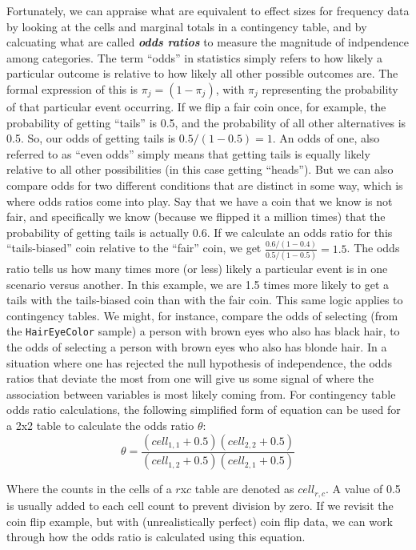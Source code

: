 \documentclass[]{book}
\begin{document}
Fortunately, we can appraise what are equivalent to effect sizes for frequency data by looking at the cells and marginal totals in a contingency table, and by calcuating what are called \textbf{\emph{odds ratios}} to measure the magnitude of indpendence among categories. The term ``odds'' in statistics simply refers to how likely a particular outcome is relative to how likely all other possible outcomes are. The formal expression of this is \(\pi_j=(1-\pi_j)\), with \(\pi_j\) representing the probability of that particular event occurring. If we flip a fair coin once, for example, the probability of getting ``tails'' is 0.5, and the probability of all other alternatives is 0.5. So, our odds of getting tails is \(0.5/(1-0.5) = 1\). An odds of one, also referred to as ``even odds'' simply means that getting tails is equally likely relative to all other possibilities (in this case getting ``heads''). But we can also compare odds for two different conditions that are distinct in some way, which is where odds ratios come into play. Say that we have a coin that we know is not fair, and specifically we know (because we flipped it a million times) that the probability of getting tails is actually 0.6. If we calculate an odds ratio for this ``tails-biased'' coin relative to the ``fair'' coin, we get
\(\frac{0.6/(1-0.4)}{0.5/(1-0.5)}=1.5\). The odds ratio tells us how many times more (or less) likely a particular event is in one scenario versus another. In this example, we are 1.5 times more likely to get a tails with the tails-biased coin than with the fair coin. This same logic applies to contingency tables. We might, for instance, compare the odds of selecting (from the \texttt{HairEyeColor} sample) a person with brown eyes who also has black hair, to the odds of selecting a person with brown eyes who also has blonde hair. In a situation where one has rejected the null hypothesis of independence, the odds ratios that deviate the most from one will give us some signal of where the association between variables is most likely coming from. For contingency table odds ratio calculations, the following simplified form of equation can be used for a 2x2 table to calculate the odds ratio \(\theta\):
\[\theta=\frac{(cell_{1,1}+0.5)(cell_{2,2}+0.5)}{(cell_{1,2}+0.5)(cell_{2,1}+0.5)}\]

Where the counts in the cells of a \(r\)x\(c\) table are denoted as \(cell_{r,c}\). A value of 0.5 is usually added to each cell count to prevent division by zero. If we revisit the coin flip example, but with (unrealistically perfect) coin flip data, we can work through how the odds ratio is calculated using this equation.
\end{document}
